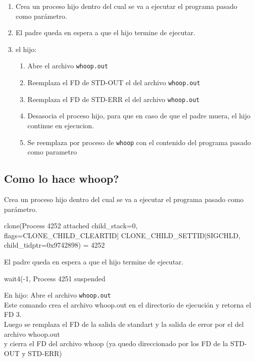 \begin{enumerate}
 \item Crea un proceso hijo dentro del cual se va a ejecutar el programa pasado como par\'ametro.
 \item El padre queda en espera a que el hijo termine de ejecutar.
 \item el hijo:
 \begin{enumerate}
  \item Abre el archivo \verb|whoop.out|
  \item Reemplaza el FD de STD-OUT el del archivo \verb|whoop.out|
  \item Reemplaza el FD de STD-ERR el del archivo \verb|whoop.out|
  \item Desasocia el proceso hijo, para que en caso de que el padre muera, el hijo continue en ejecucion.
  \item Se reemplaza por proceso de \verb|whoop| con el contenido del programa pasado como parametro
 \end{enumerate}
\end{enumerate}

\newpage

\subsection{Como lo hace whoop?}

Crea un proceso hijo dentro del cual se va a ejecutar el programa pasado como par\'ametro.

\begin{framed}
\begin{verbatimtab}
clone(Process 4252 attached child_stack=0, flags=CLONE_CHILD_CLEARTID|
  CLONE_CHILD_SETTID|SIGCHLD, child_tidptr=0x9742898) = 4252
\end{verbatimtab}
\end{framed}

El padre queda en espera a que el hijo termine de ejecutar. 

\begin{framed}
\begin{verbatimtab}
[pid  4251] wait4(-1, Process 4251 suspended
\end{verbatimtab}
\end{framed}

En hijo: Abre el archivo \verb|whoop.out|\\
Este comando crea el archivo whoop.out en el directorio de ejecuci\'on y retorna el FD 3.\\
Luego se remplaza el FD de la salida de standart y la salida de error por el del archivo whoop.out\\
y cierra el FD del archivo whoop (ya quedo direccionado por los FD de la STD-OUT y STD-ERR)

